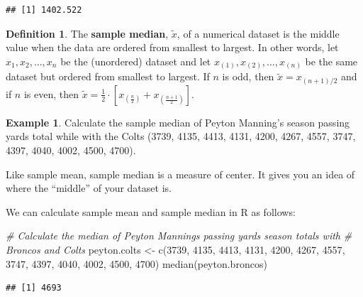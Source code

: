 \documentclass[
  11pt,
]{book}
\newenvironment{Shaded}{\begin{snugshade}}{\end{snugshade}}
\newcommand{\CommentTok}[1]{\textcolor[rgb]{0.56,0.35,0.01}{\textit{#1}}}
\newcommand{\DecValTok}[1]{\textcolor[rgb]{0.00,0.00,0.81}{#1}}
\newcommand{\FunctionTok}[1]{\textcolor[rgb]{0.00,0.00,0.00}{#1}}
\newcommand{\NormalTok}[1]{#1}
\newcommand{\OtherTok}[1]{\textcolor[rgb]{0.56,0.35,0.01}{#1}}
\theoremstyle{definition}
\newtheorem{definition}{Definition}[chapter]
\theoremstyle{definition}
\newtheorem{example}{Example}[chapter]
\theoremstyle{definition}
\theoremstyle{definition}
\theoremstyle{remark}
\begin{document}
\begin{verbatim}
## [1] 1402.522
\end{verbatim}

\begin{definition}
The \textbf{sample median}, \(\tilde{x}\), of a numerical dataset is the middle value when the data are ordered from smallest to largest. In other words, let \(x_1, x_2, \ldots, x_n\) be the (unordered) dataset and let \(x_{(1)},x_{(2)}, \ldots, x_{(n)}\) be the same dataset but ordered from smallest to largest. If \(n\) is odd, then \(\tilde{x} = x_{(n+1)/2}\) and if \(n\) is even, then \(\tilde{x} = \frac{1}{2} \cdot \left[x_{\left(\frac{n}{2}\right)} + x_{\left(\frac{n+1}{2}\right)}\right]\).
\end{definition}

\begin{example}
Calculate the sample median of Peyton Manning's season passing yards total while with the Colts (3739, 4135, 4413, 4131, 4200, 4267, 4557, 3747, 4397, 4040, 4002, 4500, 4700).
\end{example}

\hfill\break
\hfill\break
\hfill\break
\hfill\break
\hfill\break
\vfill

Like sample mean, sample median is a measure of center. It gives you an idea of where the ``middle'' of your dataset is.

We can calculate sample mean and sample median in R as follows:

\begin{Shaded}
\begin{Highlighting}[]
\CommentTok{\# Calculate the median of Peyton Manning\textquotesingle{}s passing yards season totals with }
\CommentTok{\# Broncos and Colts}
\NormalTok{peyton.colts }\OtherTok{\textless{}{-}} \FunctionTok{c}\NormalTok{(}\DecValTok{3739}\NormalTok{, }\DecValTok{4135}\NormalTok{, }\DecValTok{4413}\NormalTok{, }\DecValTok{4131}\NormalTok{, }\DecValTok{4200}\NormalTok{, }\DecValTok{4267}\NormalTok{, }\DecValTok{4557}\NormalTok{, }\DecValTok{3747}\NormalTok{, }\DecValTok{4397}\NormalTok{, }\DecValTok{4040}\NormalTok{, }
                  \DecValTok{4002}\NormalTok{, }\DecValTok{4500}\NormalTok{, }\DecValTok{4700}\NormalTok{)}
\FunctionTok{median}\NormalTok{(peyton.broncos)}
\end{Highlighting}
\end{Shaded}

\begin{verbatim}
## [1] 4693
\end{verbatim}
\end{document}
